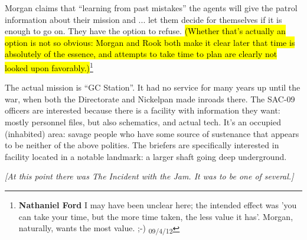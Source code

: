 Morgan claims that ``learning from past mistakes'' the agents will give the patrol information about their mission and ... let them decide for themselves if it is enough to go on.  They have the option to refuse.  \hl{(Whether that's actually an option is not so obvious: Morgan and Rook both make it clear later that time is absolutely of the essence, and attempts to take time to plan are clearly not looked upon favorably.)}\footnote{\textbf{Nathaniel Ford }I may have been unclear here; the intended effect was 'you can take your time, but the more time taken, the less value it has'. Morgan, naturally, wants the most value. ;-) \textsubscript{09/4/12 }}



The actual mission is ``GC Station''.  It had no service for many years up until the war, when both the Directorate and Nickelpan made inroads there.  The SAC-09 officers are interested because there is a facility with information they want: mostly personnel files, but also schematics, and actual tech.   It's an occupied (inhabited) area: savage people who have some source of sustenance that appears to be neither of the above polities.  The briefers are specifically interested in facility located in a notable landmark: a larger shaft going deep underground.



\textit{{[}At this point there was The Incident with the Jam.  It was to be one of several.{]}}



